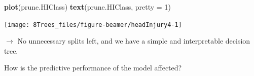 \documentclass[10pt,ignorenonframetext,]{beamer}
\newenvironment{Shaded}{\begin{snugshade}}{\end{snugshade}}
\newcommand{\KeywordTok}[1]{\textcolor[rgb]{0.13,0.29,0.53}{\textbf{#1}}}
\newcommand{\DataTypeTok}[1]{\textcolor[rgb]{0.13,0.29,0.53}{#1}}
\newcommand{\DecValTok}[1]{\textcolor[rgb]{0.00,0.00,0.81}{#1}}
\newcommand{\NormalTok}[1]{#1}
\begin{document}
\begin{frame}[fragile]

\scriptsize

\begin{Shaded}
\begin{Highlighting}[]
\KeywordTok{plot}\NormalTok{(prune.HIClass)}
\KeywordTok{text}\NormalTok{(prune.HIClass, }\DataTypeTok{pretty =} \DecValTok{1}\NormalTok{)}
\end{Highlighting}
\end{Shaded}

\begin{center}\texttt{[image: 8Trees\_files/figure-beamer/headInjury4-1]} \end{center}

\normalsize
\(\rightarrow\) No unnecessary splits left, and we have a simple and
interpretable decision tree.

How is the predictive performance of the model affected?

\end{frame}
\end{document}
